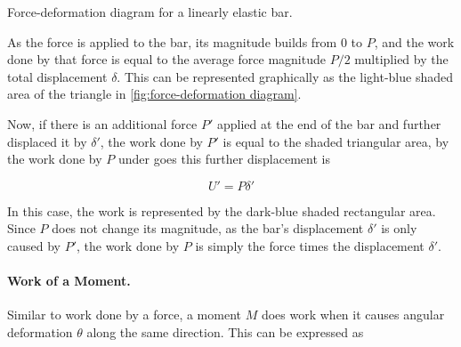 \documentclass[
10pt,
a4paper,
openany,
svgnames,
]{kaobook} %
\begin{document}
\begin{marginfigure}
  \centering
  \caption{Force-deformation diagram for a linearly elastic bar.}
  \label{fig:force-deformation diagram}
\end{marginfigure}

As the force is applied to the bar, its magnitude builds from 0 to $P$, and the work done by that force is equal to the average force magnitude $P/2$ multiplied by the total displacement $\delta$. This can be represented graphically as the light-blue shaded area of the triangle in \cref{fig:force-deformation diagram}.

Now, if there is an additional force $P'$ applied at the end of the bar and further displaced it by $\delta'$, the work done by $P'$ is equal to the shaded triangular area, by the work done by $P$ under goes this further displacement is

\begin{equation}
  U' = P \delta'
\end{equation}

In this case, the work is represented by the dark-blue shaded rectangular area. Since $P$ does not change its magnitude, as the bar's displacement $\delta'$ is only caused by $P'$, the work done by $P$ is simply the force times the displacement $\delta'$.

\paragraph{Work of a Moment.}

Similar to work done by a force, a moment $M$ does work when it causes angular deformation $\theta$ along the same direction. This can be expressed as

\begin{figure}[h]
  \centering
\end{figure}
\end{document}
